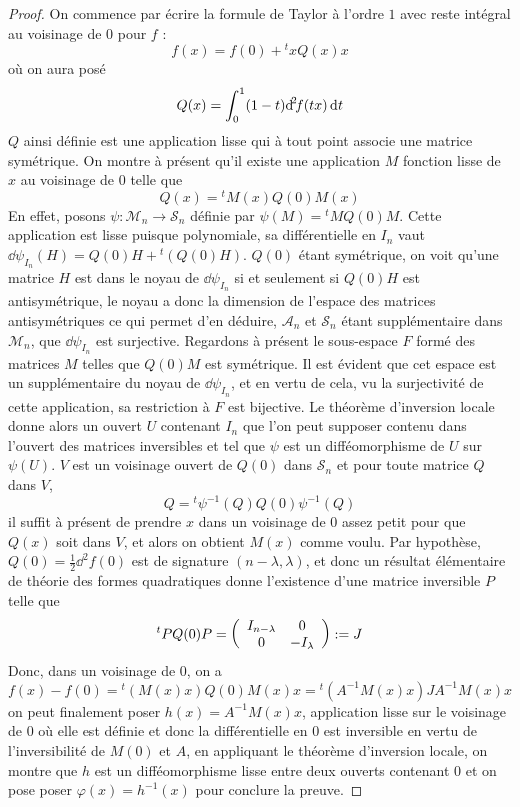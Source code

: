 \begin{proof}
    On commence par écrire la formule de Taylor à l'ordre $1$ avec reste intégral au voisinage 
    de $0$ pour $f$ :
    \[
        f(x)=f(0)+{}^txQ(x)x
    \]
    où on aura posé 
    \[
        Q(x)=\int_0^1(1-t){\operatorname{d}\hskip-1.5pt}^{2}\hskip-1.5ptf(tx)\operatorname{d}\hskip-1.5pt t
    \]
    $Q$ ainsi définie est une application lisse qui à tout point associe une matrice symétrique.
    On montre à présent qu'il existe une application $M$ fonction lisse de $x$ au voisinage de 
    $0$ telle que 
    \[
        Q(x)={}^tM(x)Q(0)M(x)
    \]
    En effet, posons $\psi:\mathcal M_n\to \mathcal S_n$ définie par $\psi(M)={}^tMQ(0)M$.
    Cette application est lisse puisque polynomiale, sa différentielle en $I_n$ vaut 
    $\dd\psi_{I_n}(H)=Q(0)H+{}^t(Q(0)H)$.
    $Q(0)$ étant symétrique, on voit qu'une matrice $H$ est dans le noyau de $\dd\psi_{I_n}$ 
    si et seulement si $Q(0)H$ est antisymétrique, le noyau a donc la dimension de l'espace 
    des matrices antisymétriques ce qui permet d'en  déduire, $\mathcal A_n$ et $\mathcal S_n$ 
    étant supplémentaire dans $\mathcal M_n$, que $\dd\psi_{I_n}$ est surjective.
    Regardons à présent le sous-espace $F$ formé des matrices $M$ telles que $Q(0)M$ est 
    symétrique. 
    Il est évident que cet espace est un supplémentaire du noyau de $\dd\psi_{I_n}$, et en 
    vertu de cela, vu la surjectivité de cette application,  sa restriction à $F$ est bijective. 
    Le théorème d'inversion locale donne alors un ouvert $U$ contenant $I_n$ que l'on peut 
    supposer contenu dans l'ouvert des matrices inversibles et tel que $\psi$ est un 
    difféomorphisme de $U$ sur $\psi(U)$. 
    $V$ est un voisinage ouvert de $Q(0)$ dans $\mathcal S_n$ et pour toute matrice $Q$ dans $V$,
    \[
        Q={}^t\psi^{-1}(Q)Q(0)\psi^{-1}(Q)
    \]
    il suffit à présent de prendre $x$ dans un voisinage de $0$ assez petit pour que $Q(x)$ 
    soit dans $V$, et alors on obtient $M(x)$ comme voulu.
    Par hypothèse, $Q(0)=\frac12\dd^2f(0)$ est de signature $(n-\lambda,\lambda)$, et donc un 
    résultat élémentaire de théorie des formes quadratiques donne l'existence d'une matrice 
    inversible $P$ telle que 
    \[
        {}^tPQ(0)P=
        \left(\begin{array}{c c} I_{n-\lambda} & 0\\ 0 & -I_{\lambda} \end{array}\right):=J
    \]
    Donc, dans un voisinage de $0$, on a 
    \[
        f(x)-f(0)={}^t(M(x)x)Q(0)M(x)x={}^t(A^{-1}M(x)x)JA^{-1}M(x)x
    \]
    on peut finalement poser $h(x)=A^{-1}M(x)x$, application lisse sur le voisinage de $0$ où 
    elle est définie et donc la différentielle en $0$ est inversible en vertu de l'inversibilité
    de $M(0)$ et $A$, en appliquant le théorème d'inversion locale, on montre que $h$ est un 
    difféomorphisme lisse entre deux ouverts contenant $0$ et on pose poser $\varphi(x)=h^{-1}(x)$ 
    pour conclure la preuve.
\end{proof}

